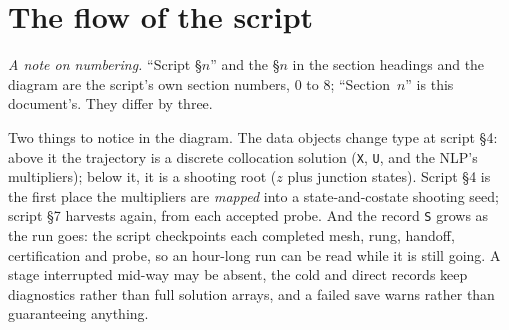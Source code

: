 \documentclass[11pt]{article}
\newcommand{\file}[1]{\texttt{#1}}
\begin{document}
\section{The flow of the script}

\emph{A note on numbering.} ``Script \S$n$'' and the \S$n$ in the section
headings and the diagram are the script's own section numbers, 0 to 8;
``Section~$n$'' is this document's. They differ by three.

\begin{intu}
Two things to notice in the diagram. The data objects change type at
script \S4: above it the trajectory is a discrete collocation solution
(\file{X}, \file{U}, and the NLP's multipliers); below it, it is a shooting
root ($z$ plus junction states). Script \S4 is the first place the
multipliers are \emph{mapped} into a state-and-costate shooting seed;
script \S7 harvests again, from each accepted probe. And the record
\file{S} grows as the run goes: the script checkpoints each completed mesh,
rung, handoff, certification and probe, so an hour-long run can be read
while it is still going. A stage interrupted mid-way may be absent, the
cold and direct records keep diagnostics rather than full solution arrays,
and a failed save warns rather than guaranteeing anything.
\end{intu}
\end{document}

